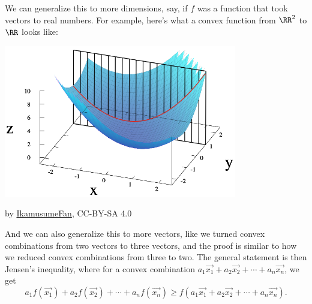 \documentclass[11pt,paper=letter]{scrartcl}
\begin{document}
We can generalize this to more dimensions, say, if $f$ was a function that took vectors to real numbers. For example, here's what a convex function from $\RR^2$ to $\RR$ looks like:
\begin{center}
\includegraphics[width=4in]{1.png}

\footnotesize{by \href{https://commons.wikimedia.org/wiki/File:Partial_func_eg.svg}{IkamusumeFan}, CC-BY-SA 4.0}
\end{center}
And we can also generalize this to more vectors, like we turned convex combinations from two vectors to three vectors, and the proof is similar to how we reduced convex combinations from three to two. The general statement is then Jensen's inequality, where for a convex combination $a_1\vec{x_1} + a_2\vec{x_2} + \cdots + a_n\vec{x_n}$, we get
\[
  a_1f(\vec{x_1}) + a_2f(\vec{x_2}) + \cdots + a_nf(\vec{x_n}) \ge f\left(a_1\vec{x_1} + a_2\vec{x_2} + \cdots + a_n\vec{x_n}\right).
\]
\end{document}
